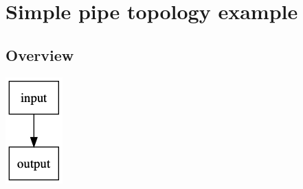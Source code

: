 \documentclass[11pt]{article}
\begin{document}
\section{Simple pipe topology example}
\label{sec:orgb7cf5a4}
\subsection{Overview}
\label{sec:orgefb425f}
\begin{center}
\includegraphics[width=.9\linewidth]{pipe.png}
\end{center}
\end{document}
